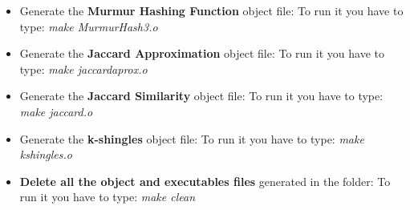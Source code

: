 \documentclass[12pt]{article}
\begin{document}
\begin{itemize}
   \item Generate the \textbf{Murmur Hashing Function} object file:
   To run it you have to type: \textit{make MurmurHash3.o}
   \item Generate the \textbf{Jaccard Approximation} object file:
   To run it you have to type: \textit{make jaccardaprox.o}
   \item Generate the \textbf{Jaccard Similarity} object file:
   To run it you have to type: \textit{make jaccard.o}
   \item Generate the \textbf{k-shingles} object file:
   To run it you have to type: \textit{make kshingles.o}
   \item \textbf{Delete all the object and executables files} generated in the folder:
   To run it you have to type: \textit{make clean}
   \end{itemize}
\end{document}
